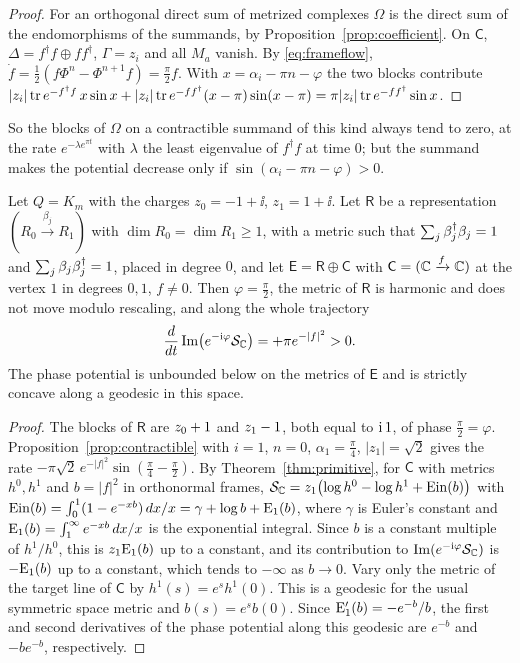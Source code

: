\begin{proof}
For an orthogonal direct sum of metrized complexes $\Omega$ is the direct sum
of the endomorphisms of the summands, by Proposition~\ref{prop:coefficient}. On
$\mathsf C$, $\Delta=f^\dagger f\oplus ff^\dagger$, $\Gamma=z_i$ and all $M_a$
vanish. By \eqref{eq:frameflow},
$\dot f=\frac12(f\Phi^n-\Phi^{n+1}f)=\frac\pi2f$. With
$x=\alpha_i-\pi n-\varphi$ the two blocks contribute
$|z_i|\operatorname{tr} e^{-f^\dagger f}\,x\sin x+|z_i|\operatorname{tr} e^{-ff^\dagger}(x-\pi)\sin(x-\pi)
=\pi|z_i|\operatorname{tr} e^{-ff^\dagger}\sin x$.
\end{proof}

So the blocks of $\Omega$ on a contractible summand of this kind always tend
to zero, at the rate $e^{-\lambda e^{\pi t}}$ with $\lambda$ the least
eigenvalue of $f^\dagger f$ at time $0$; but the summand makes the potential
decrease only if $\sin(\alpha_i-\pi n-\varphi)>0$.

\begin{corollary}\label{cor:increase}
Let $Q=K_m$ with the charges $z_0=-1+\ii$, $z_1=1+\ii$. Let $\mathsf R$ be
a representation $(R_0\xrightarrow{\beta_j}R_1)$ with
$\dim R_0=\dim R_1\geq1$,
with a metric such that $\sum_j\beta_j^\dagger\beta_j=1$ and
$\sum_j\beta_j\beta_j^\dagger=1$, placed in degree $0$, and let
$\mathsf E=\mathsf R\oplus\mathsf C$ with $\mathsf C=(\mathbb C\xrightarrow{f}\mathbb C)$ at
the vertex $1$ in degrees $0,1$, $f\neq0$. Then $\varphi=\frac\pi2$, the
metric of $\mathsf R$ is harmonic and does not move modulo rescaling, and
along the whole trajectory
\[
 \frac d{dt}\operatorname{Im}\bigl(e^{-\mathrm i\varphi}\mathcal S_{\mathbb C}\bigr)=+\pi e^{-|f|^2}>0 .
\]
The phase potential is unbounded below on the metrics of $\mathsf E$ and
is strictly concave along a geodesic in this space.
\end{corollary}

\begin{proof}
The blocks of $\mathsf R$ are $z_0+1$ and $z_1-1$, both equal to
$\mathrm i\,1$, of phase $\frac\pi2=\varphi$. Proposition~\ref{prop:contractible}
with $i=1$, $n=0$, $\alpha_1=\frac\pi4$, $|z_1|=\sqrt2$ gives the rate
$-\pi\sqrt2\,e^{-|f|^2}\sin(\frac\pi4-\frac\pi2)$. By
Theorem~\ref{thm:primitive}, for $\mathsf C$ with metrics $h^0,h^1$ and
$b=|f|^2$ in orthonormal frames,
$\mathcal S_{\mathbb C}=z_1\bigl(\log h^0-\log h^1+\operatorname{Ein}(b)\bigr)$ with
$\operatorname{Ein}(b)=\int_0^1(1-e^{-xb})\,dx/x=\gamma+\log b+\mathrm E_1(b)$, where $\gamma$ is
Euler's constant and $\mathrm E_1(b)=\int_1^\infty e^{-xb}\,dx/x$ is the exponential
integral. Since $b$ is a constant multiple of $h^1/h^0$, this is
$z_1\mathrm E_1(b)$ up to a constant, and its contribution to
$\operatorname{Im}(e^{-\mathrm i\varphi}\mathcal S_{\mathbb C})$ is $-\mathrm E_1(b)$ up to a constant, which tends to
$-\infty$ as $b\to0$. Vary only the metric of the target line of
$\mathsf C$ by $h^1(s)=e^s h^1(0)$. This is a geodesic for the usual
symmetric space metric and $b(s)=e^s b(0)$. Since $\mathrm E_1'(b)=-e^{-b}/b$,
the first and second derivatives of the phase potential along this
geodesic are $e^{-b}$ and $-be^{-b}$, respectively.
\end{proof}

